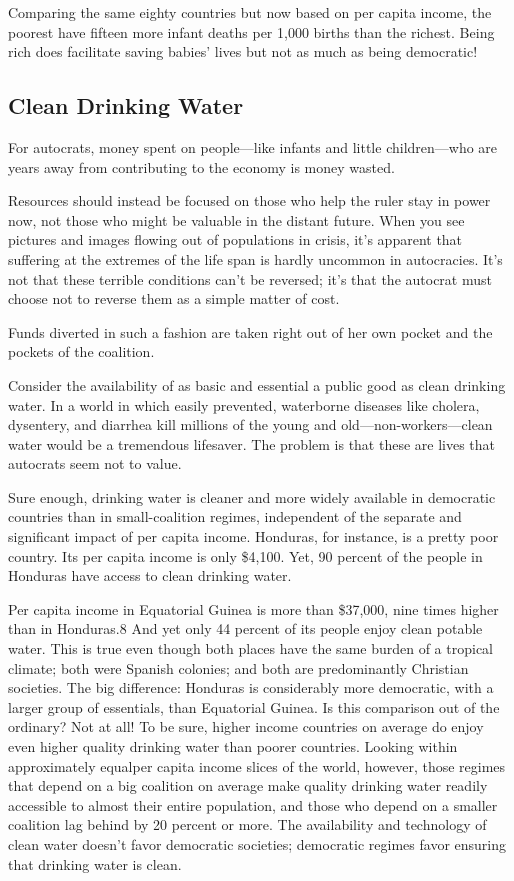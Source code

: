 \documentclass[10pt]{article}
\begin{document}
{\large Comparing the same eighty countries but now based on per capita income,
the poorest have fifteen more infant deaths per 1,000 births than the richest.
Being rich does facilitate saving babies' lives but not as much as being
democratic!}

\subsection{Clean Drinking Water}

{\large For autocrats, money spent on people---like infants and little
children---who are years away from contributing to the economy is money wasted.}

{\large Resources should instead be focused on those who help the ruler stay in
power now, not those who might be valuable in the distant future. When you see
pictures and images flowing out of populations in crisis, it's apparent that
suffering at the extremes of the life span is hardly uncommon in autocracies.
It's not that these terrible conditions can't be reversed; it's that the autocrat
must choose not to reverse them as a simple matter of cost.}

{\large Funds diverted in such a fashion are taken right out of her own pocket
and the pockets of the coalition.}

{\large Consider the availability of as basic and essential a public good as
clean drinking water. In a world in which easily prevented, waterborne diseases
like cholera, dysentery, and diarrhea kill millions of the young and
old---non-workers---clean water would be a tremendous lifesaver. The problem is
that these are lives that autocrats seem not to value.}

{\large Sure enough, drinking water is cleaner and more widely available in
democratic countries than in small-coalition regimes, independent of the separate
and significant impact of per capita income. Honduras, for instance, is a pretty
poor country. Its per capita income is only \$4,100. Yet, 90 percent of the
people in Honduras have access to clean drinking water.}

{\large Per capita income in Equatorial Guinea is more than \$37,000, nine times
higher than in Honduras.8 And yet only 44 percent of its people enjoy clean
potable water. This is true even though both places have the same burden of a
tropical climate; both were Spanish colonies; and both are predominantly
Christian societies. The big difference: Honduras is considerably more
democratic, with a larger group of essentials, than Equatorial Guinea. Is this
comparison out of the ordinary? Not at all! To be sure, higher income countries
on average do enjoy even higher quality drinking water than poorer countries.
Looking within approximately equalper capita income slices of the world, however,
those regimes that depend on a big coalition on average make quality drinking
water readily accessible to almost their entire population, and those who depend
on a smaller coalition lag behind by 20 percent or more. The availability and
technology of clean water doesn't favor democratic societies; democratic regimes
favor ensuring that drinking water is clean.}
\end{document}
